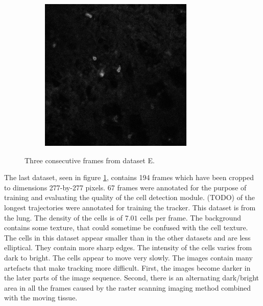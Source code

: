 \begin{figure}[h]
\begin{subfigure}{.32\textwidth}
		\end{subfigure}
		\hfill
		\begin{subfigure}{.32\textwidth}
		\includegraphics[width=\textwidth]{images/seriesm170_13cropped018}
		\end{subfigure}
		\caption{Three consecutive frames from dataset E.}
		\label{fig:data_datasetE}
	\end{figure}
        
    The last dataset, seen in figure \cref{fig:data_datasetE}, contains 194 frames which have been cropped to dimensions 277-by-277 pixels. 67 frames were annotated for the purpose of training and evaluating the quality of the cell detection module. (TODO) of the longest trajectories were annotated for training the tracker. This dataset is from the lung. The density of the cells is of $7.01$ cells per frame. The background contains some texture, that could sometime be confused with the cell texture. The cells in this dataset appear smaller than in the other datasets and are less elliptical. They contain more sharp edges. The intensity of the cells varies from dark to bright. The cells appear to move very slowly. The images contain many artefacts that make tracking more difficult. First, the images become darker in the later parts of the image sequence. Second, there is an alternating dark/bright area in all the frames caused by the raster scanning imaging method combined with the moving tissue.
    
